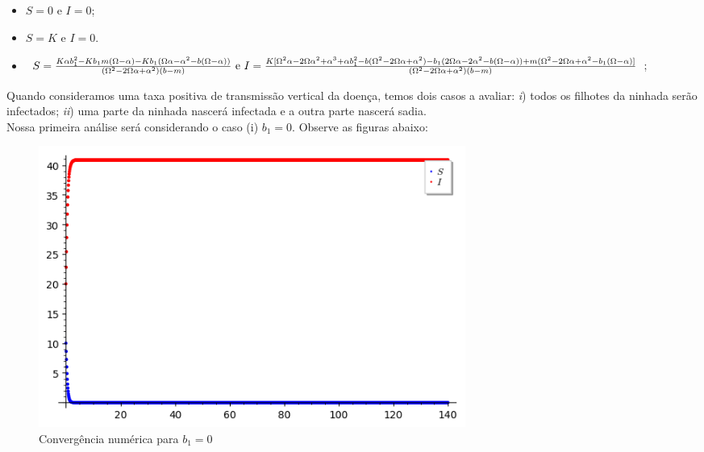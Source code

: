 \documentclass{article}
\begin{document}
\begin{itemize}
\item $S=0 \mbox{ e } I=0$;
\item $S=K \mbox{ e } I=0$.
\item $S=\frac{K\alpha b_1^2-Kb_1m(\Omega-\alpha) -Kb_1(\Omega\alpha - \alpha^2-b(\Omega-\alpha)   )  }{(\Omega^2-2\Omega\alpha+\alpha^2)(b-m)} \mbox{ e }\\ I=\frac{K[\Omega^2\alpha-2\Omega\alpha^2+\alpha^3+\alpha b_1^2-b(\Omega^2-2\Omega\alpha+\alpha^2)-b_1(2\Omega\alpha-2\alpha
^2 -b(\Omega-\alpha))+m(\Omega^2-2\Omega\alpha+\alpha^2-b_1(\Omega-\alpha)]}{(\Omega^2-2\Omega\alpha+\alpha^2)(b-m)}$;
\end{itemize}

\noindent Quando consideramos uma taxa positiva de transmissão vertical da doença, temos dois casos a avaliar: \textit{i}) todos os filhotes da ninhada serão infectados; \textit{ii}) uma parte da ninhada nascerá infectada e a outra parte nascerá sadia.\\

\noindent Nossa primeira análise será considerando o caso (i) $b_1 = 0$. Observe as figuras abaixo:

\begin{figure}[!h]
    \centering
     \includegraphics[width=14cm]{imagens/b1zerocurvas.png}
    \caption{Convergência numérica para $b_1=0$}
    \label{fig:my_label}
\end{figure}
\end{document}
